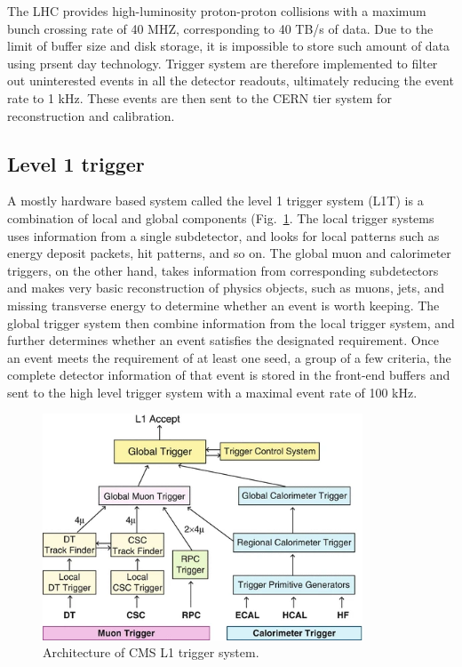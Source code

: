 The LHC provides high-luminosity proton-proton collisions with a maximum bunch crossing rate of 40 MHZ, corresponding to 40 TB/s of data.
Due to the limit of buffer size and disk storage, it is impossible to store such amount of data using prsent day technology.
Trigger system are therefore implemented to filter out uninterested events in all the detector readouts, ultimately reducing the event rate to 1 kHz. 
These events are then sent to the CERN tier system for reconstruction and calibration.

\subsection{Level 1 trigger}
A mostly hardware based system called the level 1 trigger system (L1T) is a combination of local and global components (Fig.~\ref{fig:cms_l1t}.
The local trigger systems uses information from a single subdetector, and looks for local patterns such as energy deposit packets, hit patterns, and so on.
The global muon and calorimeter triggers, on the other hand, takes information from corresponding subdetectors and makes very basic reconstruction of physics objects, such as muons, jets, and missing transverse energy to determine whether an event is worth keeping.
The global trigger system then combine information from the local trigger system, and further determines whether an event satisfies the designated requirement.
Once an event meets the requirement of at least one seed, a group of a few criteria, the complete detector information of that event is stored in the front-end buffers and sent to the high level trigger system with a maximal event rate of 100  kHz.

\begin{figure}\centering
    \includegraphics[width=0.85\textwidth]{figure/cms_l1t.png}
    \caption{Architecture of CMS L1 trigger system.}
    \label{fig:cms_l1t}
\end{figure}

